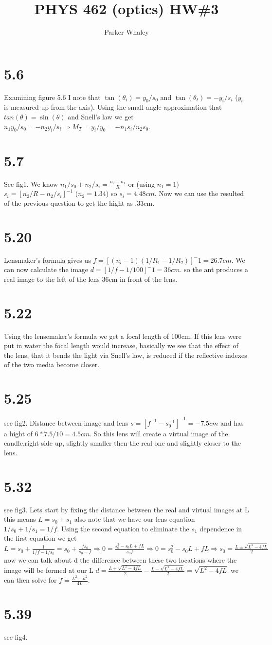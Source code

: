 \documentclass[12pt,a4paper]{article}
\author{Parker Whaley}
\title{PHYS 462 (optics) HW\#3}
\begin{document}
\maketitle
\section{5.6}
Examining figure 5.6 I note that $\tan(\theta_i)=y_0/s_0$ and $\tan(\theta_t)=-y_i/s_i$ ($y_i$ is measured up from the axis).  Using the small angle approximation that $tan(\theta)=\sin(\theta)$ and Snell’s law we get $n_1y_0/s_0=-n_2y_i/s_i\Rightarrow M_T=y_i/y_0=-n_1s_i/n_2s_0$.

\section{5.7}
See fig1.  We know $n_1/s_0+n_2/s_i=\frac{n_2-n_1}{R}$ or (using $n_1=1$) $s_i=[n_2/R-n_2/s_i]^{-1}$ ($n_2=1.34$) so $s_i=4.48cm$.  Now we can use the resulted of the previous question to get the hight as .33cm.

\section{5.20}
Lensmaker's formula gives us $f=[(n_l-1)(1/R_1-1/R_2)]^-1=26.7cm$.  We can now calculate the image $d=[1/f-1/100]^-1=36cm$.  so the ant produces a real image to the left of the lens 36cm in front of the lens.

\section{5.22}
Using the lensemaker's formula we get a focal length of 100cm.  If this lens were put in water the focal length would increase, basically we see that the effect of the lens, that it bends the light via Snell’s law, is reduced if the reflective indexes of the two media become closer.

\section{5.25}
see fig2.  Distance between image and lens $s=[f^{-1}-s_0^{-1}]^{-1}=-7.5cm$ and has a hight of $6*7.5/10=4.5cm$.  So this lens will create a virtual image of the candle,right side up, slightly smaller then the real one and slightly closer to the lens.

\section{5.32}
see fig3.  Lets start by fixing the distance between the real and virtual images at L this means $L=s_0+s_1$ also note that we have our lens equation $1/s_0+1/s_1=1/f$.  Using the second equation to eliminate the $s_1$ dependence in the first equation we get $L=s_0+\frac{1}{1/f-1/s_0}=s_0+\frac{fs_0}{s_0-f}\Rightarrow 0=\frac{s_0^2-s_0L+fL}{s_0f} \Rightarrow 0=s_0^2-s_0L+fL \Rightarrow s_0=\frac{L\pm \sqrt{L^2-4fL}}{2}$ now we can talk about d the difference between these two locations where the image will be formed at our L $d=\frac{L+ \sqrt{L^2-4fL}}{2}-\frac{L- \sqrt{L^2-4fL}}{2}=\sqrt{L^2-4fL}$ we can then solve for $f=\frac{L^2-d^2}{4L}$.

\section{5.39}
see fig4.
\end{document}
